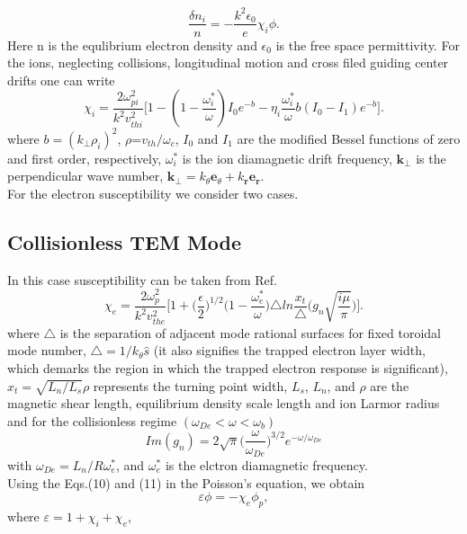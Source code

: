 \documentclass[aip,pop,amsmath,amssymb,showpacs,reprint,floatfix,lengthcheck]{revtex4-1}
\begin{document}
\begin{equation}
  \frac{\delta n_{i}}{n}=-\frac{k^2\epsilon_{0}}{e}\chi_{i}\phi.
\end{equation}
Here n is the equlibrium electron density and $\epsilon_{0}$ is the free space permittivity. For the ions, neglecting collisions, longitudinal motion and cross filed guiding center drifts one can write 
\begin{equation}
\chi_{i}=\frac{2\omega_{pi}^2}{k^2v_{thi}^2}\biggl[1-(1-\frac{\omega_{i}^{*}}{\omega})I_{0}e^{-b}-\eta_{i}\frac{\omega_{i}^{*}}{\omega}b(I_{0}-I_{1})e^{-b}\biggr]. 
\end{equation}
where $b=(k_{\perp}\rho_{i})^2$, $\rho$=$v_{th}/\omega_{c}$, $I_{0}$ and $I_{1}$ are the modified Bessel functions of zero and first order, respectively, $\omega_{i}^{*}$ is the ion diamagnetic drift frequency, $\textbf{k}_{\perp}$ is the perpendicular wave number, $\textbf{k}_{\perp}=k_{\theta}\textbf{e}_{\theta}+k_{\textbf{r}}\textbf{e}_{\textbf{r}}$.\\
 
For the electron susceptibility we consider two cases.
\subsection{Collisionless TEM Mode}
In this case susceptibility can be taken from Ref.\cite{gang1991kinetic}
\begin{equation}
\chi_{e}=\frac{2\omega_{p}^2}{k^2v_{the}^2}\biggl[1+\biggl(\frac{\epsilon}{2}\biggr)^{1/2}\biggl(1-\frac{\omega_{e}^*}{\omega}\biggr)\triangle ln\frac{x_{t}}{\triangle}\biggl(g_{n}\sqrt{\frac{i\mu}{\pi}}\biggr)\biggr].
\end{equation}
where $\triangle$ is the separation of adjacent mode rational surfaces for fixed toroidal mode number, $\triangle=1/k_{\theta}\hat{s}$ (it also signifies the trapped electron layer width, which demarks the region in which the trapped electron response is significant), $x_{t}=\sqrt{L_{n}/L_{s}} \rho$ represents the turning point width, $L_{s}$, $L_{n}$, and $\rho$ are the magnetic shear length, equilibrium density scale length and ion Larmor radius and for the collisionless regime $(\omega_{De}<\omega<\omega_{b})$
\begin{equation}
 Im(g_{n})=2\sqrt\pi\biggl(\frac{\omega}{\omega_{De}}\biggr)^{3/2}e^{-\omega/\omega_{De}}
\end{equation}
with   $\omega_{De}=L_{n}/R \omega_{e}^{*}$, and $\omega_{e}^{*}$ is the elctron diamagnetic frequency.\\
Using the Eqs.(10) and (11) in the Poisson's equation, we obtain
\begin{equation}
 \varepsilon\phi=-\chi_{e}\phi_{p},
\end{equation}
where $\varepsilon=1+\chi_{i}+\chi_{e}$, 
\end{document}
